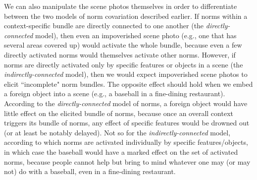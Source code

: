 \documentclass[12pt]{article}
\begin{document}
We can also manipulate the scene photos themselves in order to
differentiate between the two models of norm covariation described
earlier.  If norms within a context-specific bundle are directly
connected to one another (the {\em directly-connected} model), then
even an impoverished scene photo (e.g., one that has several areas
covered up) would activate the whole bundle, because even a few
directly activated norms would themselves activate other norms.
However, if norms are directly activated only by specific features or
objects in a scene (the {\em indirectly-connected} model), then we
would expect impoverished scene photos to elicit ``incomplete" norm
bundles.  The opposite effect should hold when we embed a foreign
object into a scene (e.g., a baseball in a fine-dining restaurant).
According to the {\em directly-connected} model of norms, a foreign
object would have little effect on the elicited bundle of norms,
because once an overall context triggers its bundle of norms, any
effect of specific features would be drowned out (or at least be
notably delayed).  Not so for the {\em indirectly-connected} model,
according to which norms are activated individually by specific
features/objects, in which case the baseball would have a marked
effect on the set of activated norms, because people cannot help but
bring to mind whatever one may (or may not) do with a baseball, even
in a fine-dining restaurant.


\end{document}
